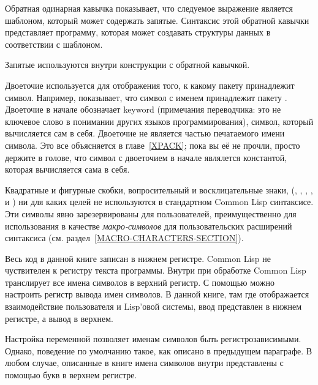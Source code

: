 \begin{indentdesc}{1.2pc}
\item[\cd{{\Xbq}}] Обратная одинарная кавычка показывает, что следуемое
выражение является шаблоном, который может содержать запятые. Синтаксис этой
обратной кавычки представляет программу, которая может создавать структуры
данных в соответствии с шаблоном.

\item[\cd{,}] Запятые используются внутри конструкции с обратной кавычкой.

\item[\cd{:}] Двоеточие используется для отображения того, к какому пакету
принадлежит символ. Например,  показывает, что символ с
именем  принадлежит пакету . Двоеточие в начале обозначает 
keyword (примечания переводчика: это не ключевое слово в понимании других языков 
программирования), символ, который вычисляется сам в себя. Двоеточие не является
частью печатаемого имени символа. 
Это все объясняется в главе~\ref{XPACK}; пока вы её не прочли, просто держите в
голове, что символ с двоеточием в начале являлется константой, которая
вычисляется сама в себя.
\end{indentdesc}

Квадратные и фигурные скобки, вопросительный и восклицательные знаки,
(\cd{{\Xlbracket}}, \cd{{\Xrbracket}}, \cd{{\Xlbrace}}, \cd{{\Xrbrace}}, 
и  \cd{!}) ни для каких целей не используются в стандартном Common Lisp 
синтаксисе. Эти символы явно зарезервированы для пользователей, преимущественно
для использования в качестве \emph{макро-символов} для пользовательских расширений
синтаксиса (см. раздел~\ref{MACRO-CHARACTERS-SECTION}).

Весь код в данной книге записан в нижнем регистре. Common Lisp не чуствителен к
регистру текста программы. Внутри при обработке Common Lisp транслирует все
имена символов в верхний регистр. С помощью  можно настроить
регистр вывода имен символов.
В данной книге, там где отображается взаимодействие пользователя и Lisp'овой
системы, ввод представлен в нижнем регистре, а вывод в верхнем.

Настройка переменной  позволяет именам символов быть
регистрозависимыми. Однако, поведение по умолчанию такое, как описано в
предыдущем параграфе. В любом случае, описанные в книге имена символов внутри
представлены с помощью букв в верхнем регистре.

\fi